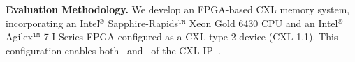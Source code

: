 \noindent \textbf{Evaluation Methodology.}
We develop an FPGA-based CXL memory system, incorporating an Intel$^\circledR$ Sapphire-Rapids$^\texttt{TM}$ Xeon Gold 6430 CPU and an Intel$^\circledR$ Agilex$^\texttt{TM}$-7 I-Series FPGA configured as a CXL type-2 device (CXL 1.1). This configuration enables both \cxlmem~and \cxlcache~of the CXL IP~\cite{cxl_ip}. 
